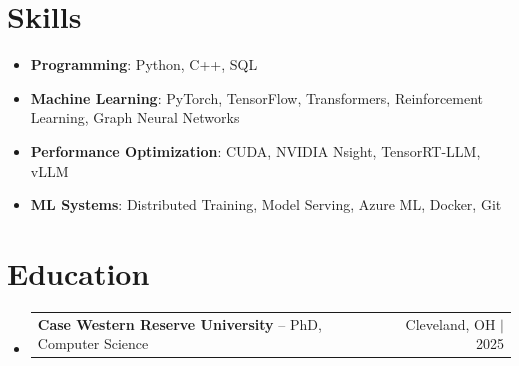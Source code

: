 \documentclass[letterpaper,13pt]{article}
\makeatletter
\newcommand{\resumeProjectHeading}[2]{
    \item
    \begin{tabular*}{\textwidth}{l@{\extracolsep{\fill}}r}
      \small#1 & #2 \\
    \end{tabular*}\vspace{-4pt}
}
\newcommand{\resumeSubHeadingListStart}{\begin{itemize}[leftmargin=0in, label={}]}
\newcommand{\resumeSubHeadingListEnd}{\end{itemize}}
\makeatother
\begin{document}
\section{Skills}
\vspace{0.02cm}
\begin{itemize}[leftmargin=0.15in, label={}, itemsep=2pt, topsep=1pt]
  \item \textbf{Programming}: Python, C++, SQL
  \item \textbf{Machine Learning}: PyTorch, TensorFlow, Transformers, Reinforcement Learning, Graph Neural Networks
  \item \textbf{Performance Optimization}: CUDA, NVIDIA Nsight, TensorRT-LLM, vLLM
  \item \textbf{ML Systems}: Distributed Training, Model Serving, Azure ML, Docker, Git
\end{itemize}
\vspace{0.02cm}

\section{Education}
\resumeSubHeadingListStart
  \resumeProjectHeading{\textbf{Case Western Reserve University} -- PhD, Computer Science}{Cleveland, OH $|$ 2025}
\resumeSubHeadingListEnd
\end{document}
